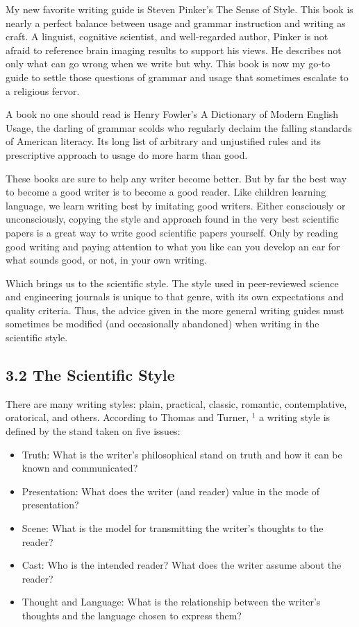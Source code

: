 My new favorite writing guide is Steven Pinker's The Sense of Style. This book is nearly a perfect balance between usage and grammar instruction and writing as craft. A linguist, cognitive scientist, and well-regarded author, Pinker is not afraid to reference brain imaging results to support his views. He describes not only what can go wrong when we write but why. This book is now my go-to guide to settle those questions of grammar and usage that sometimes escalate to a religious fervor.

A book no one should read is Henry Fowler's A Dictionary of Modern English Usage, the darling of grammar scolds who regularly declaim the falling standards of American literacy. Its long list of arbitrary and unjustified rules and its prescriptive approach to usage do more harm than good.

These books are sure to help any writer become better. But by far the best way to become a good writer is to become a good reader. Like children learning language, we learn writing best by imitating good writers. Either consciously or unconsciously, copying the style and approach found in the very best scientific papers is a great way to write good scientific papers yourself. Only by reading good writing and paying attention to what you like can you develop an ear for what sounds good, or not, in your own writing.

Which brings us to the scientific style. The style used in peer-reviewed science and engineering journals is unique to that genre, with its own expectations and quality criteria. Thus, the advice given in the more general writing guides must sometimes be modified (and occasionally abandoned) when writing in the scientific style.

\subsection*{3.2 The Scientific Style}
There are many writing styles: plain, practical, classic, romantic, contemplative, oratorical, and others. According to Thomas and Turner, ${ }^{1}$ a writing style is defined by the stand taken on five issues:

\begin{itemize}
  \item Truth: What is the writer's philosophical stand on truth and how it can be known and communicated?
  \item Presentation: What does the writer (and reader) value in the mode of presentation?
  \item Scene: What is the model for transmitting the writer's thoughts to the reader?
  \item Cast: Who is the intended reader? What does the writer assume about the reader?
  \item Thought and Language: What is the relationship between the writer's thoughts and the language chosen to express them?
\end{itemize}

